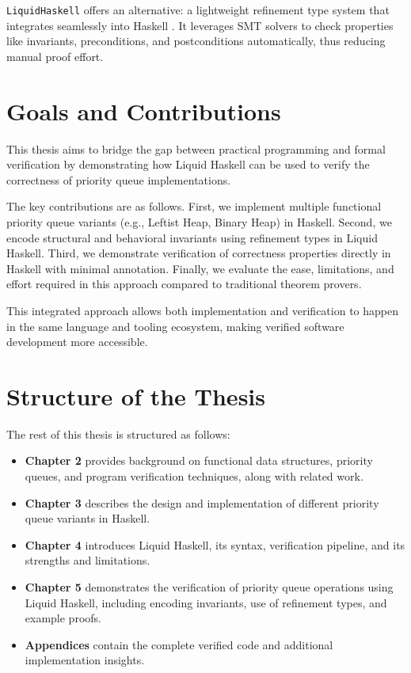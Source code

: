 \texttt{LiquidHaskell} offers an alternative: a lightweight refinement type system that integrates seamlessly into Haskell \cite{vazou2018}.
It leverages SMT solvers to check properties like invariants, preconditions, and postconditions automatically, thus reducing manual proof effort.
\section{ Goals and Contributions }
This thesis aims to bridge the gap between practical programming and formal verification by demonstrating how Liquid Haskell can be used to verify the correctness of priority queue implementations.

The key contributions are as follows.
First, we implement multiple functional priority queue variants (e.g., Leftist Heap, Binary Heap) in Haskell.
Second, we encode structural and behavioral invariants using refinement types in Liquid Haskell.
Third, we demonstrate verification of correctness properties directly in Haskell with minimal annotation.
Finally, we evaluate the ease, limitations, and effort required in this approach compared to traditional theorem provers.

This integrated approach allows both implementation and verification to happen in the same language and tooling ecosystem, making verified software development more accessible.
\section{ Structure of the Thesis }
The rest of this thesis is structured as follows:

\begin{itemize}
  \item \textbf{Chapter 2} provides background on functional data structures, priority queues, and program verification techniques, along with related work.
  \item \textbf{Chapter 3} describes the design and implementation of different priority queue variants in Haskell.
  \item \textbf{Chapter 4} introduces Liquid Haskell, its syntax, verification pipeline, and its strengths and limitations.
  \item \textbf{Chapter 5} demonstrates the verification of priority queue operations using Liquid Haskell, including encoding invariants, use of refinement types, and example proofs.
  \item \textbf{Appendices} contain the complete verified code and additional implementation insights.
\end{itemize}
